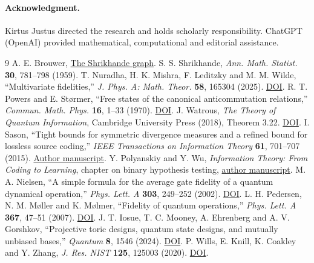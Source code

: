 \documentclass[11pt,letterpaper]{article}
\begin{document}
\paragraph{Acknowledgment.} Kirtus Justus directed the research and holds scholarly responsibility. ChatGPT (OpenAI) provided mathematical, computational and editorial assistance.
\small\begin{thebibliography}{9}
 A. E. Brouwer, \href{https://aeb.win.tue.nl/drg/graphs/Shrikhande.html}{The Shrikhande graph}. S. S. Shrikhande, \emph{Ann. Math. Statist.} \textbf{30}, 781--798 (1959).
 T. Nuradha, H. K. Mishra, F. Leditzky and M. M. Wilde, “Multivariate fidelities,” \textit{J. Phys. A: Math. Theor.} \textbf{58}, 165304 (2025). \href{https://doi.org/10.1088/1751-8121/adc645}{DOI}.
 R. T. Powers and E. Størmer, “Free states of the canonical anticommutation relations,” \textit{Commun. Math. Phys.} \textbf{16}, 1--33 (1970). \href{https://doi.org/10.1007/BF01645492}{DOI}.
 J. Watrous, \emph{The Theory of Quantum Information}, Cambridge University Press (2018), Theorem 3.22. \href{https://doi.org/10.1017/9781316848142}{DOI}.
 I. Sason, “Tight bounds for symmetric divergence measures and a refined bound for lossless source coding,” \emph{IEEE Transactions on Information Theory} \textbf{61}, 701--707 (2015). \href{https://arxiv.org/abs/1403.7164}{Author manuscript}.
 Y. Polyanskiy and Y. Wu, \emph{Information Theory: From Coding to Learning}, chapter on binary hypothesis testing, \href{https://people.lids.mit.edu/yp/homepage/data/itbook-export.pdf}{author manuscript}.
 M. A. Nielsen, “A simple formula for the average gate fidelity of a quantum dynamical operation,” \emph{Phys. Lett. A} \textbf{303}, 249--252 (2002). \href{https://doi.org/10.1016/S0375-9601(02)01272-0}{DOI}.
 L. H. Pedersen, N. M. Møller and K. Mølmer, “Fidelity of quantum operations,” \emph{Phys. Lett. A} \textbf{367}, 47--51 (2007). \href{https://doi.org/10.1016/j.physleta.2007.02.069}{DOI}.
 J. T. Iosue, T. C. Mooney, A. Ehrenberg and A. V. Gorshkov, “Projective toric designs, quantum state designs, and mutually unbiased bases,” \emph{Quantum} \textbf{8}, 1546 (2024). \href{https://doi.org/10.22331/q-2024-12-03-1546}{DOI}.
 P. Wills, E. Knill, K. Coakley and Y. Zhang, \emph{J. Res. NIST} \textbf{125}, 125003 (2020). \href{https://doi.org/10.6028/jres.125.003}{DOI}.
\end{thebibliography}
\end{document}
